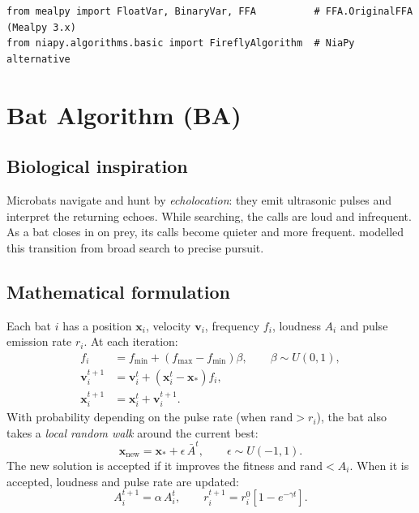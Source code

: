 \documentclass[11pt,a4paper]{article}
\newcommand{\vect}[1]{\mathbf{#1}}
\begin{document}
\begin{lstlisting}
from mealpy import FloatVar, BinaryVar, FFA          # FFA.OriginalFFA (Mealpy 3.x)
from niapy.algorithms.basic import FireflyAlgorithm  # NiaPy alternative
\end{lstlisting}

\section{Bat Algorithm (BA)}
\label{sec:ba}

\subsection{Biological inspiration}

Microbats navigate and hunt by \emph{echolocation}: they emit ultrasonic pulses and interpret the returning echoes. While searching, the calls are loud and infrequent. As a bat closes in on prey, its calls become quieter and more frequent. \citet{yang2010} modelled this transition from broad search to precise pursuit.

\subsection{Mathematical formulation}

Each bat $i$ has a position $\vect{x}_i$, velocity $\vect{v}_i$, frequency $f_i$, loudness $A_i$ and pulse emission rate $r_i$. At each iteration:
\begin{align}
  f_i &= f_{\min} + \left( f_{\max} - f_{\min} \right) \beta, \qquad \beta \sim U(0,1), \\
  \vect{v}_i^{t+1} &= \vect{v}_i^{t} + \left( \vect{x}_i^{t} - \vect{x}_{*} \right) f_i, \\
  \vect{x}_i^{t+1} &= \vect{x}_i^{t} + \vect{v}_i^{t+1}.
\end{align}
With probability depending on the pulse rate (when $\text{rand} > r_i$), the bat also takes a \emph{local random walk} around the current best:
\begin{equation}
  \vect{x}_{\text{new}} = \vect{x}_{*} + \epsilon \, \bar{A}^{t}, \qquad \epsilon \sim U(-1, 1).
\end{equation}
The new solution is accepted if it improves the fitness and $\text{rand} < A_i$. When it is accepted, loudness and pulse rate are updated:
\begin{equation}
  A_i^{t+1} = \alpha \, A_i^{t}, \qquad r_i^{t+1} = r_i^{0} \left[ 1 - e^{-\gamma t} \right].
\end{equation}
\end{document}

